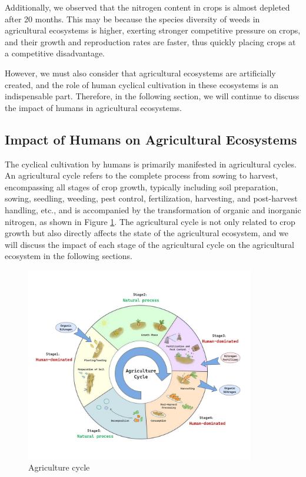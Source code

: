 \documentclass{mcmthesis}
\begin{document}
Additionally, we observed that the nitrogen content in crops is almost depleted after 20 months. This may be because the species diversity of weeds in agricultural ecosystems is higher, exerting stronger competitive pressure on crops, and their growth and reproduction rates are faster, thus quickly placing crops at a competitive disadvantage.

However, we must also consider that agricultural ecosystems are artificially created, and the role of human cyclical cultivation in these ecosystems is an indispensable part. Therefore, in the following section, we will continue to discuss the impact of humans in agricultural ecosystems.
\subsection{Impact of Humans on Agricultural Ecosystems}\label{sec:5.4}
The cyclical cultivation by humans is primarily manifested in agricultural cycles. An agricultural cycle refers to the complete process from sowing to harvest, encompassing all stages of crop growth, typically including soil preparation, sowing, seedling, weeding, pest control, fertilization, harvesting, and post-harvest handling, etc., and is accompanied by the transformation of organic and inorganic nitrogen, as shown in Figure \ref{fig:Agriculture_cycle}. The agricultural cycle is not only related to crop growth but also directly affects the state of the agricultural ecosystem, and we will discuss the impact of each stage of the agricultural cycle on the agricultural ecosystem in the following sections.
\begin{figure}[h] 
\centering
\includegraphics[width=10cm]{figures/Agriculture cycle.jpg}
\caption{Agriculture cycle}
\label{fig:Agriculture_cycle}
\end{figure}
\end{document}
